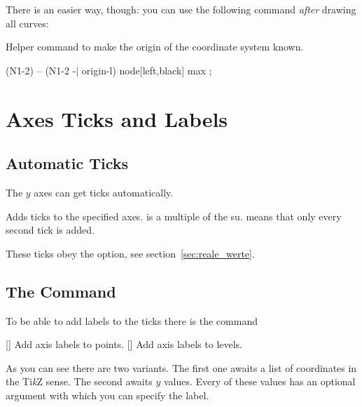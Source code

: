 \documentclass[load-preamble+]{cnltx-doc}
\newcommand*\TikZ{Ti\textit{k}Z}
\begin{document}
There is an easier way, though: you can use the following command \emph{after}
drawing all curves:
\begin{commands}
    Helper command to make the origin of the coordinate system
    known.\label{cmd:makeorigin}
\end{commands}

\begin{example}
  \begin{endiagram}[y-label = above]
    \MakeOrigin
      (N1-2) -- (N1-2 -| origin-l)
      node[left,black] {max} ;
  \end{endiagram}
\end{example}

\section{Axes Ticks and Labels}
\subsection{Automatic Ticks}

The $y$ axes can get ticks automatically.
\begin{options}
    Adds ticks to the specified axes.
     is a multiple of the \ac{su}.  means that
    only every second tick is added.
\end{options}

\begin{example}
  \begin{endiagram}
  \end{endiagram}
  \quad
  \begin{endiagram}[ticks-step=2]
  \end{endiagram}
\end{example}
These ticks obey the  option, see
section~\ref{sec:reale_werte}.

\subsection{The  Command}
To be able to add labels to the ticks there is the command
\begin{commands}
  []
    Add axis labels to points.
  [\sarg{}]
    Add axis labels to levels.
\end{commands}
As you can see there are two variants.  The first one awaits a list of
coordinates in the \TikZ{} sense.  The second awaits $y$ values.  Every of
these values has an optional argument with which you can specify the label.
\end{document}
